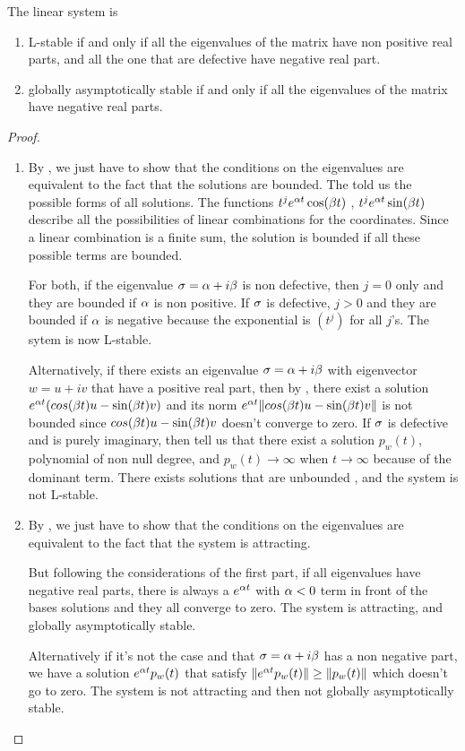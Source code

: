 \begin{theoreme}
    The linear system is 
    \begin{enumerate}
     \item L-stable if and only if all the eigenvalues of the matrix have non positive real parts, and all the one that are defective have negative real part.
    \item globally asymptotically stable if and only if all the eigenvalues of the matrix
    have negative real parts.
    \end{enumerate}
\end{theoreme}
\begin{proof} 
\quad\\
\begin{enumerate}
\item 
By , we just have to show that the conditions on the eigenvalues are equivalent to the fact that the solutions are bounded. The  told us the possible forms of all solutions. The functions $t^je^{\alpha t}\cos(\beta t)$ , $t^je^{\alpha t}\sin(\beta t)$ describe all the possibilities of linear combinations for the coordinates.
Since a linear combination is a finite sum, the solution is bounded if all these possible terms are bounded.

For both, if the eigenvalue $\sigma=\alpha+i\beta$ is non defective, then $j=0$ only and they are bounded if $\alpha$ is non positive. If $\sigma$ is defective, $j>0$ and they are bounded if $\alpha$ is negative because the exponential is $(t^j)$ for all $j$'s. The sytem is now L-stable.

Alternatively, if there exists an eigenvalue $\sigma=\alpha+i\beta$ with eigenvector $w=u+iv$ that have a positive real part, then by , there exist a solution $e^{\alpha t}(cos(\beta t)u-\sin(\beta t)v)$ and its norm $e^{\alpha t}\|cos(\beta t)u-\sin(\beta t)v\|$
is not bounded since $cos(\beta t)u-\sin(\beta t)v$ doesn't converge to zero. If $\sigma$ is defective and is purely imaginary, then  tell us that there exist a solution $p_w(t)$, polynomial of non null degree, and $p_w(t)\to\infty$ when $t\to\infty$ because of the dominant term. There exists solutions that are unbounded , and the system is not L-stable.

\item 
By , we just have to show that the conditions on the eigenvalues are equivalent to the fact that the system is attracting.

But following the considerations of the first part, if all eigenvalues have negative real parts, there is always a $e^{\alpha t}$ with $\alpha<0$ term in front of the bases solutions and they all converge to zero. The system is attracting, and globally asymptotically stable.

Alternatively if it's not the case and that $\sigma=\alpha+i\beta$ has a non negative part, we have a solution $e^{\alpha t}p_w(t)$ that satisfy $\|e^{\alpha t}p_w(t)\| \geq \|p_w(t)\|$ which doesn't go to zero. The system is not attracting and then not globally asymptotically stable.
\end{enumerate}
\end{proof}

